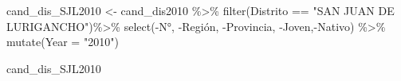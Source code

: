 \documentclass[
]{book}
\newenvironment{Shaded}{\begin{snugshade}}{\end{snugshade}}
\newcommand{\AttributeTok}[1]{\textcolor[rgb]{0.77,0.63,0.00}{#1}}
\newcommand{\FunctionTok}[1]{\textcolor[rgb]{0.00,0.00,0.00}{#1}}
\newcommand{\NormalTok}[1]{#1}
\newcommand{\OtherTok}[1]{\textcolor[rgb]{0.56,0.35,0.01}{#1}}
\newcommand{\SpecialCharTok}[1]{\textcolor[rgb]{0.00,0.00,0.00}{#1}}
\newcommand{\StringTok}[1]{\textcolor[rgb]{0.31,0.60,0.02}{#1}}
\begin{document}
\begin{Shaded}
\begin{Highlighting}[]
\NormalTok{cand\_dis\_SJL2010 }\OtherTok{\textless{}{-}}\NormalTok{ cand\_dis2010 }\SpecialCharTok{\%\textgreater{}\%}
  \FunctionTok{filter}\NormalTok{(Distrito }\SpecialCharTok{==} \StringTok{"SAN JUAN DE LURIGANCHO"}\NormalTok{)}\SpecialCharTok{\%\textgreater{}\%}
  \FunctionTok{select}\NormalTok{(}\SpecialCharTok{{-}}\StringTok{\textasciigrave{}}\AttributeTok{N°}\StringTok{\textasciigrave{}}\NormalTok{, }\SpecialCharTok{{-}}\StringTok{\textasciigrave{}}\AttributeTok{Región}\StringTok{\textasciigrave{}}\NormalTok{, }\SpecialCharTok{{-}}\StringTok{\textasciigrave{}}\AttributeTok{Provincia}\StringTok{\textasciigrave{}}\NormalTok{, }\SpecialCharTok{{-}}\StringTok{\textasciigrave{}}\AttributeTok{Joven}\StringTok{\textasciigrave{}}\NormalTok{,}\SpecialCharTok{{-}}\StringTok{\textasciigrave{}}\AttributeTok{Nativo}\StringTok{\textasciigrave{}}\NormalTok{) }\SpecialCharTok{\%\textgreater{}\%} 
  \FunctionTok{mutate}\NormalTok{(}\AttributeTok{Year =} \StringTok{"2010"}\NormalTok{)}
\end{Highlighting}
\end{Shaded}

\begin{Shaded}
\begin{Highlighting}[]
\NormalTok{cand\_dis\_SJL2010}
\end{Highlighting}
\end{Shaded}
\end{document}
